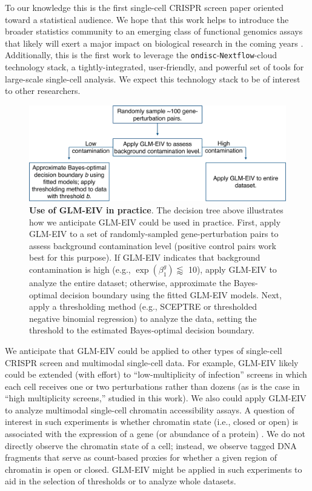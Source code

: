 \documentclass[12pt]{article}
\begin{document}
To our knowledge this is the first single-cell CRISPR screen paper oriented toward a statistical audience. We hope that this work helps to introduce the broader statistics community to an emerging class of functional genomics assays that likely will exert a major impact on biological research in the coming years \parencite{Przybyla2021}. Additionally, this is the first work to leverage the \texttt{ondisc}-\texttt{Nextflow}-cloud technology stack, a tightly-integrated, user-friendly, and powerful set of tools for large-scale single-cell analysis. We expect this technology stack to be of interest to other researchers.

\begin{figure}[h]
	\centering
	\includegraphics[width=0.9\linewidth]{figures/dec_tree.pdf}
	\caption{\textbf{Use of GLM-EIV in practice}. The decision tree above illustrates how we anticipate GLM-EIV could be used in practice. First, apply GLM-EIV to a set of randomly-sampled gene-perturbation pairs to assess background contamination level (positive control pairs work best for this purpose). If GLM-EIV indicates that background contamination is high (e.g., $\exp(\beta^g_1) \lessapprox $ 10), apply GLM-EIV to analyze the entire dataset; otherwise, approximate the Bayes-optimal decision boundary using the fitted GLM-EIV models. Next, apply a thresholding method (e.g., SCEPTRE or thresholded negative binomial regression) to analyze the data, setting the threshold to the estimated Bayes-optimal decision boundary.}\label{fig:dec_tree}
\end{figure}

We anticipate that GLM-EIV could be applied to other types of single-cell CRISPR screen and multimodal single-cell data. For example, GLM-EIV likely could be extended (with effort) to ``low-multiplicity of infection'' screens  \parencite{Schraivogel2020} in which each cell receives one or two perturbations rather than dozens (as is the case in ``high multiplicity screens,'' studied in this work). We also could apply GLM-EIV to analyze multimodal single-cell chromatin accessibility assays. A question of interest in such experiments is whether chromatin state (i.e., closed or open) is associated with the expression of a gene (or abundance of a protein) \parencite{Mimitou2021}. We do not directly observe the chromatin state of a cell; instead, we observe tagged DNA fragments that serve as count-based proxies for whether a given region of chromatin is open or closed. GLM-EIV might be applied in such experiments to aid in the selection of thresholds or to analyze whole datasets.
\end{document}
